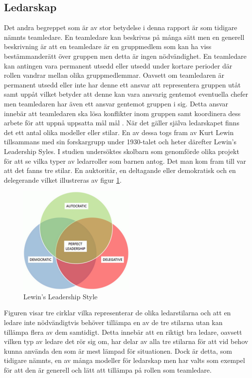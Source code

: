 \subsection{Ledarskap}
Det andra begreppet som är av stor betydelse i denna rapport är som tidigare nämnts teamledare. En teamledare kan beskrivas på många sätt men en generell beskrivning är att en teamledare är en gruppmedlem som kan ha viss bestämmanderätt över gruppen men detta är ingen nödvändighet. En teamledare kan antingen vara permanent utsedd eller utsedd under kortare perioder där rollen vandrar mellan olika gruppmedlemmar. Oavsett om teamledaren är permanent utsedd eller inte har denne ett ansvar att representera gruppen utåt samt uppåt vilket betyder att denne kan vara ansvarig gentemot eventuella chefer men teamledaren har även ett ansvar gentemot gruppen i sig. Detta ansvar innebär att teamledaren ska lösa konflikter inom gruppen samt koordinera dess arbete för att uppnå uppsatta mål mål \citep{BD}. 
\newline \newline
När det gäller själva ledarskapet finns det ett antal olika modeller eller stilar. En av dessa togs fram av Kurt Lewin tillsammans med sin forskargrupp under 1930-talet och heter därefter Lewin's Leadership Syles. I studien undersöktes skolbarn som genomförde olika projekt för att se vilka typer av ledarroller som barnen antog. Det man kom fram till var att det fanns tre stilar. En auktoritär, en deltagande eller demokratisk och en delegerande \citep{KAC} vilket illustreras av figur \ref{fig:Lewin}. 
\begin{figure}[H]
\centerline{\includegraphics{adam-tex/graphic/leadership}}
\caption{Lewin's Leadership Style}
\label{fig:Lewin}
\end{figure}
\noindent Figuren visar tre cirklar vilka representerar de olika ledarstilarna och att en ledare inte nödvändigtvis behöver tillämpa en av de tre stilarna utan kan tillämpa flera av dem samtidigt. Detta innebär att en riktigt bra ledare, oavsett vilken typ av ledare det rör sig om, har delar av alla tre stilarna för att vid behov kunna använda den som är mest lämpad för situationen. Dock är detta, som tidigare nämnts, en av många modeller för ledarskap men har valts som exempel för att den är generell och lätt att tillämpa på rollen som teamledare.